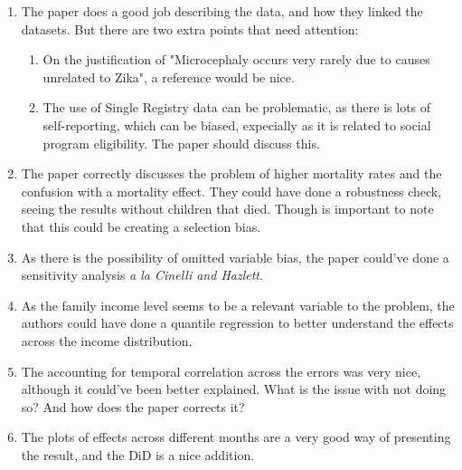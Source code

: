 \documentclass[12pt]{article}
\begin{document}
\begin{enumerate}
    \item The paper does a good job describing the data, and how they linked the datasets. But there are two extra points that need attention:
    \begin{enumerate}
        \item On the justification of "Microcephaly occurs very rarely due to causes unrelated to Zika", a reference would be nice.
        \item The use of Single Registry data can be problematic, as there is lots of self-reporting, which can be biased, expecially as it is related to social program eligibility. The paper should discuss this.
    \end{enumerate}
    \item The paper correctly discusses the problem of higher mortality rates and the confusion with a mortality effect. They could have done a robustness check, seeing the results without children that died. Though is important to note that this could be creating a selection bias.
    \item As there is the possibility of omitted variable bias, the paper could've done a sensitivity analysis \textit{a la Cinelli and Hazlett}.
    \item As the family income level seems to be a relevant variable to the problem, the authors could have done a quantile regression to better understand the effects across the income distribution.
    \item The accounting for temporal correlation across the errors was very nice, although it could've been better explained. What is the issue with not doing so? And how does the paper corrects it?
    \item The plots of effects across different months are a very good way of presenting the result, and the DiD is a nice addition.
\end{enumerate}
\end{document}
